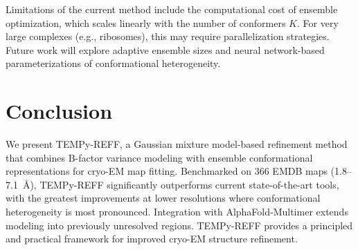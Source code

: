 \documentclass[11pt]{article}
\begin{document}
Limitations of the current method include the computational cost of ensemble optimization, which scales linearly with the number of conformers $K$. For very large complexes (e.g., ribosomes), this may require parallelization strategies. Future work will explore adaptive ensemble sizes and neural network-based parameterizations of conformational heterogeneity.

\section{Conclusion}

We present TEMPy-REFF, a Gaussian mixture model-based refinement method that combines B-factor variance modeling with ensemble conformational representations for cryo-EM map fitting. Benchmarked on 366 EMDB maps (1.8--7.1~\AA{}), TEMPy-REFF significantly outperforms current state-of-the-art tools, with the greatest improvements at lower resolutions where conformational heterogeneity is most pronounced. Integration with AlphaFold-Multimer extends modeling into previously unresolved regions. TEMPy-REFF provides a principled and practical framework for improved cryo-EM structure refinement.



\end{document}
